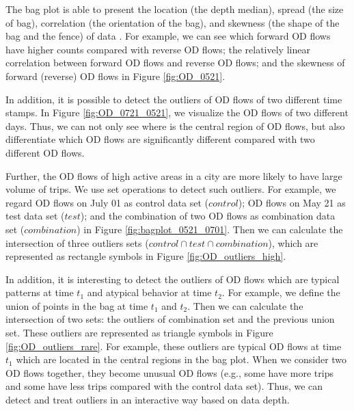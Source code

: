 \documentclass[a4paper,UKenglish]{lipics-v2016}
\begin{document}
The bag plot is able to present the location (the depth median), spread (the size of bag), correlation (the orientation of the bag), and skewness (the shape of the bag and the fence) of data \cite{rousseeuw99AS}. For example, we can see which forward OD flows have higher counts compared with reverse OD flows; the relatively linear correlation between forward OD flows and reverse OD flows; and the skewness of forward (reverse) OD flows in Figure \ref{fig:OD_0521}. 

In addition, it is possible to detect the outliers of OD flows of two different time stamps. In Figure \ref{fig:OD_0721_0521}, we visualize the OD flows of two different days. Thus, we can not only see where is the central region of OD flows, but also differentiate which OD flows are significantly different compared with two different OD flows.

Further, the OD flows of high active areas in a city are more likely to have large volume of trips. We use set operations to detect such outliers. For example, we regard OD flows on July 01  as control data set ($control$); OD flows on May 21 as test data set ($test$); and the combination of two OD flows as combination data set ($combination$) in Figure \ref{fig:bagplot_0521_0701}. Then we can calculate the intersection of three outliers sets ($control \cap test \cap combination$), which are represented as rectangle symbols in Figure \ref{fig:OD_outliers_high}. 

In addition, it is interesting to detect the outliers of OD flows which are typical patterns at time $t_1$ and atypical behavior at time $t_2$.  For example, we define the union of points in the bag at time $t_1$ and $t_2$. Then we can calculate the intersection of two sets: the outliers of combination set and the previous union set. These outliers are represented as triangle symbols in Figure \ref{fig:OD_outliers_rare}. For example, these outliers are typical OD flows at time $t_1$ which are located in the central regions in the bag plot. When we consider two OD flows together, they become unusual OD flows (e.g., some have more trips and some have less trips compared with the control data set). Thus, we can detect and treat outliers in an interactive way based on data depth.

\end{document}
